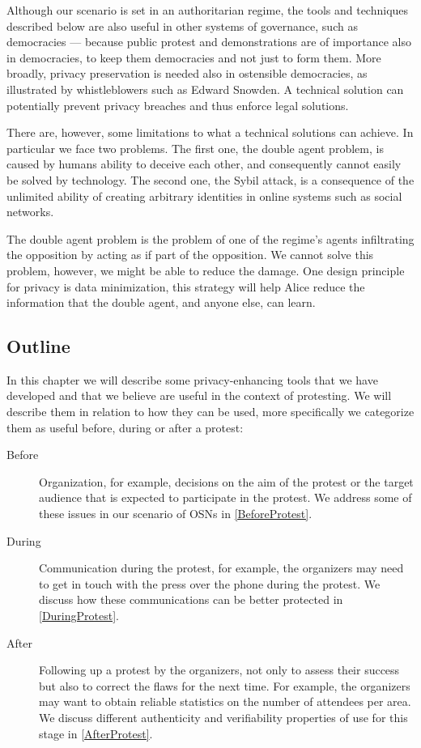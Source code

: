 Although our scenario is set in an authoritarian regime, the tools and
techniques described below are also useful in other systems of
governance, such as democracies --- because public protest and
demonstrations are of importance also in democracies, to keep them
democracies and not just to form them. More broadly, privacy
preservation is needed also in ostensible democracies, as illustrated
by whistleblowers such as Edward Snowden. A technical solution can
potentially prevent privacy breaches and thus enforce legal solutions.

There are, however, some limitations to what a technical solutions can achieve.
In particular we face two problems.
The first one, the double agent problem, is caused by humans ability to deceive 
each other, and consequently cannot easily be solved by technology.
The second one, the Sybil attack, is a consequence of the unlimited ability of creating 
arbitrary identities in online systems such as social networks.

\label{DoubleAgentProblem}
The double agent problem is the problem of one of the regime's agents 
infiltrating the opposition by acting as if part of the opposition.
We cannot solve this problem, however, we might be able to reduce the damage.
One design principle for privacy is data minimization, this strategy will help 
Alice reduce the information that the double agent, and anyone else, can learn.

\label{SybilAttacks}


\subsection{Outline}
\label{Outline}

In this chapter we will describe some privacy-enhancing tools that we have 
developed and that we believe are useful in the context of protesting.
We will describe them in relation to how they can be used, more specifically we 
categorize them as useful before, during or after a protest:
\begin{description}
  \item[Before]
    Organization, for example, decisions on the aim of the protest or the 
    target audience that is expected to participate in the protest.
    We address some of these issues in our scenario of \acp{OSN} in 
    \cref{BeforeProtest}.

  \item[During]
    Communication during the protest, for example, the organizers may need to 
    get in touch with the press over the phone during the protest.
    We discuss how these communications can be better protected in 
    \cref{DuringProtest}.

  \item[After]
    Following up a protest by the organizers, not only to assess their success 
    but also to correct the flaws for the next time.  For example, the 
    organizers may want to obtain reliable statistics on the number of 
    attendees per area.
    We discuss different authenticity and verifiability properties of use for 
    this stage in \cref{AfterProtest}.
\end{description}

